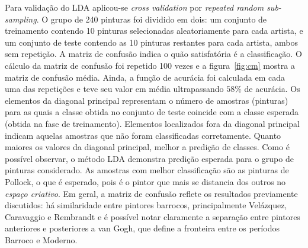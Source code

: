 Para validação do LDA aplicou-se \textit{cross validation}
por \textit{repeated random sub-sampling}. O grupo de 240 pinturas foi
dividido em dois: um conjunto de treinamento contendo 10 pinturas
selecionadas aleatoriamente para cada artista, e um conjunto de teste
contendo as 10 pinturas restantes para cada artista, ambos sem
repetição. A matriz de confusão indica o quão satisfatória é a
classificação. O cálculo da matriz de confusão foi repetido 100 vezes
e a figura~\ref{fig:cm} mostra a matriz de confusão média. Ainda, a
função de acurácia foi calculada em cada uma das repetições e teve seu
valor em média ultrapassando $58\%$ de acurácia. Os elementos da
diagonal principal representam o número de amostras (pinturas) para as
quais a classe obtida no conjunto de teste coincide com a classe
esperada (obtida na fase de treinamento). Elementos localizados fora
da diagonal principal indicam aquelas amostras que não foram
classificadas corretamente. Quanto maiores os valores
da diagonal principal, melhor a predição de classes. Como é possível
observar, o método LDA demonstra predição esperada para o grupo de
pinturas considerado. As amostras com melhor classificação são as
pinturas de Pollock, o que é esperado, pois é o pintor que mais se
distancia dos outros no \textit{espaço criativo}. Em geral, a matriz
de confusão reflete os resultados previamente discutidos: há
similaridade entre pintores barrocos, principalmente Velázquez,
Caravaggio e Rembrandt e é possível notar claramente a separação entre
pintores anteriores e posteriores a van Gogh, que define a fronteira
entre os períodos Barroco e Moderno.


